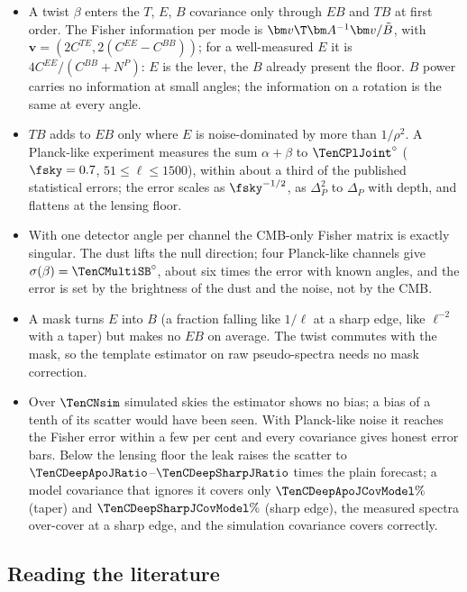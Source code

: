 \begin{recap}
\begin{itemize}[itemsep=1pt,leftmargin=1.2em]
  \item A twist $\beta$ enters the $T$, $E$, $B$ covariance only through $EB$ and $TB$ at first order. The Fisher
        information per mode is $\bm v\T\bm A^{-1}\bm v/\tilde B$, with $\bm v=(2C^{TE},2(C^{EE}-C^{BB}))$; for a well-measured $E$
        it is $4C^{EE}/(C^{BB}+N^P)$: $E$ is the lever, the $B$ already present the floor. $B$ power carries no
        information at small angles; the information on a rotation is the same at every angle.
  \item $TB$ adds to $EB$ only where $E$ is noise-dominated by more than $1/\rho^2$. A Planck-like experiment measures the
        sum $\alpha+\beta$ to ${\TenCPlJoint}^\circ$ ($\fsky=0.7$, $51\le\ell\le1500$), within about a third of the published statistical
        errors; the error scales as $\fsky^{-1/2}$, as $\Delta_P^2$ to $\Delta_P$ with depth, and flattens at the lensing floor.
  \item With one detector angle per channel the CMB-only Fisher matrix is exactly singular. The dust lifts the null
        direction; four Planck-like channels give $\sigma(\beta)={\TenCMultiSB}^\circ$, about six times the error with known angles,
        and the error is set by the brightness of the dust and the noise, not by the CMB.
  \item A mask turns $E$ into $B$ (a fraction falling like $1/\ell$ at a sharp edge, like $\ell^{-2}$ with a taper) but makes no
        $EB$ on average. The twist commutes with the mask, so the template estimator on raw pseudo-spectra needs no mask correction.
  \item Over $\TenCNsim$ simulated skies the estimator shows no bias; a bias of a tenth of its scatter would have been seen. With Planck-like noise it
        reaches the Fisher error within a few per cent and every covariance gives honest error bars. Below the lensing
        floor the leak raises the scatter to $\TenCDeepApoJRatio$--$\TenCDeepSharpJRatio$ times the plain forecast; a model covariance that ignores it covers only $\TenCDeepApoJCovModel\%$ (taper) and $\TenCDeepSharpJCovModel\%$ (sharp edge), the
        measured spectra over-cover at a sharp edge, and the simulation covariance covers correctly.
\end{itemize}
\end{recap}

\subsection*{Reading the literature}
\label{10b:sec:reading-list}

